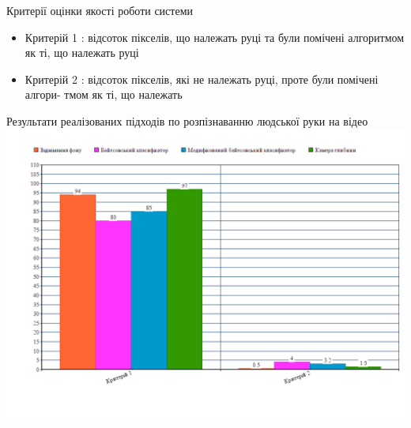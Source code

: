 \begin{frame}{Критерії оцінки якості роботи системи}
	\manimate
	\begin{itemize}
		\item Критерій 1 : відсоток пікселів, що належать руці та були помічені алгоритмом як ті, що належать руці
		\item Критерій 2 : відсоток пікселів, які не належать руці, проте були помічені алгори-
		тмом як ті, що належать
	\end{itemize}
\end{frame}

\begin{frame}{Результати реалізованих підходів по розпізнаванню людської руки на відео}
	\manimate
	\includegraphics[width=0.85\linewidth]{im/graph}
\end{frame}

